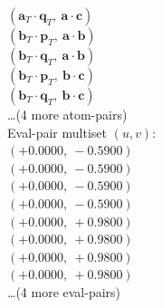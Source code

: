 \documentclass[a4paper,11pt]{article}
\newcommand{\pdcegfomjfhook}[2]{\mathbf{#1} \cdot \mathbf{#2}}
\newcommand{\fpbeomcfokjooi}[2]{\mathbf{#1}_T \cdot \mathbf{#2}_T}
\begin{document}
$(\fpbeomcfokjooi{a}{q},\ \pdcegfomjfhook{a}{c})$\\
$(\fpbeomcfokjooi{b}{p},\ \pdcegfomjfhook{a}{b})$\\
$(\fpbeomcfokjooi{b}{q},\ \pdcegfomjfhook{a}{b})$\\
$(\fpbeomcfokjooi{b}{p},\ \pdcegfomjfhook{b}{c})$\\
$(\fpbeomcfokjooi{b}{q},\ \pdcegfomjfhook{b}{c})$\\
\quad \ldots (4 more atom-pairs)\\
\quad Eval-pair multiset $(u, v)$:\\
$(+0.0000,\ -0.5900)$\\
$(+0.0000,\ -0.5900)$\\
$(+0.0000,\ -0.5900)$\\
$(+0.0000,\ -0.5900)$\\
$(+0.0000,\ +0.9800)$\\
$(+0.0000,\ +0.9800)$\\
$(+0.0000,\ +0.9800)$\\
$(+0.0000,\ +0.9800)$\\
\quad \ldots (4 more eval-pairs)\\
\end{document}
